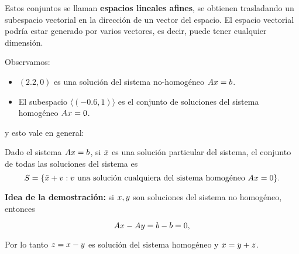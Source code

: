 Estos conjuntos se llaman \textbf{espacios lineales afines}, se obtienen
trasladando un subespacio vectorial en la dirección de un vector del
espacio. El espacio vectorial podría estar generado por varios vectores,
es decir, puede tener cualquier dimensión.

Observamos:

\begin{itemize}
\item   $(2.2, 0)$ es una solución del sistema no-homogéneo $\Ab\xb = \bb$.
\item   El subespacio $\langle (-0.6, 1) \rangle$ es el conjunto de
    soluciones del sistema homogéneo $\Ab\xb = 0$.
\end{itemize}
y esto vale en general:

\begin{proposicion}
Dado el sistema $\Ab\xb = \bb$, si $\tilde \xb$ es una solución
particular del sistema, el conjunto de todas las soluciones del sistema
es
$$
S = \{\tilde \xb + \vb: \vb \text{ una solución cualquiera del sistema homogéneo } \Ab\xb = 0\}.
$$
\end{proposicion}

\textbf{Idea de la demostración:} si $\xb, \yb$ son soluciones del sistema no
homogéneo, entonces

$$
\Ab\xb - \Ab\yb = \bb - \bb = 0,
$$

Por lo tanto $\zb = \xb-\yb$ es solución del sistema homogéneo y $\xb = \yb + \zb$.

